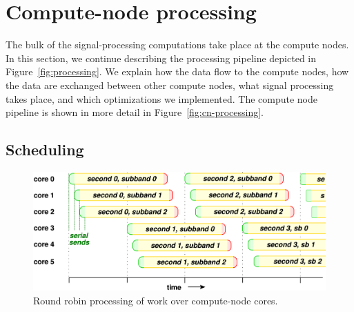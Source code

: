 \documentclass{sig-alternate}
\begin{document}



\section{Compute-node processing}
\label{sec:CNProc}

\begin{figure}[ht]
\end{figure}

The bulk of the signal-processing computations take place at the compute nodes.
In this section, we continue describing the processing pipeline depicted in
Figure~\ref{fig:processing}. 
We explain how the data flow to the compute nodes, how the data are exchanged
between other compute nodes, what signal processing takes place, and which
optimizations we implemented. The compute node pipeline is shown in more detail
in Figure~\ref{fig:cn-processing}.


\subsection{Scheduling}

\begin{figure}[ht]
\includegraphics[width=\columnwidth]{round-robin.pdf}
\caption{Round robin processing of work over compute-node cores.}
\label{fig:round-robin}
\end{figure}
\end{document}
